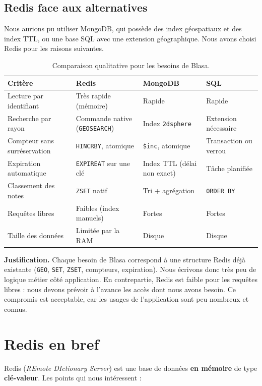 \documentclass[11pt,a4paper]{article}
\begin{document}
\subsection{Redis face aux alternatives}
Nous aurions pu utiliser MongoDB, qui poss\`ede des index g\'eospatiaux et des index TTL, ou une base SQL avec une extension g\'eographique. Nous avons choisi Redis pour les raisons suivantes.

\begin{table}[htbp]\centering
\begin{tabularx}{\textwidth}{@{}L{3.3cm}XXX@{}}
\toprule
\textbf{Crit\`ere} & \textbf{Redis} & \textbf{MongoDB} & \textbf{SQL}\\
\midrule
Lecture par identifiant & Tr\`es rapide (m\'emoire) & Rapide & Rapide\\
Recherche par rayon & Commande native (\texttt{GEOSEARCH}) & Index \texttt{2dsphere} & Extension n\'ecessaire\\
Compteur sans surr\'eservation & \texttt{HINCRBY}, atomique & \texttt{\$inc}, atomique & Transaction ou verrou\\
Expiration automatique & \texttt{EXPIREAT} sur une cl\'e & Index TTL (d\'elai non exact) & T\^ache planifi\'ee\\
Classement des notes & \texttt{ZSET} natif & Tri + agr\'egation & \texttt{ORDER BY}\\
Requ\^etes libres & Faibles (index manuels) & Fortes & Fortes\\
Taille des donn\'ees & Limit\'ee par la RAM & Disque & Disque\\
\bottomrule
\end{tabularx}
\caption{Comparaison qualitative pour les besoins de Blasa.}
\end{table}

\textbf{Justification.} Chaque besoin de Blasa correspond \`a une structure Redis d\'ej\`a existante (\texttt{GEO}, \texttt{SET}, \texttt{ZSET}, compteurs, expiration). Nous \'ecrivons donc tr\`es peu de logique m\'etier c\^ot\'e application. En contrepartie, Redis est faible pour les requ\^etes libres : nous devons pr\'evoir \`a l'avance les acc\`es dont nous avons besoin. Ce compromis est acceptable, car les usages de l'application sont peu nombreux et connus.

\section{Redis en bref}
Redis (\emph{REmote DIctionary Server}) est une base de donn\'ees \textbf{en m\'emoire} de type \textbf{cl\'e-valeur}. Les points qui nous int\'eressent :
\end{document}
